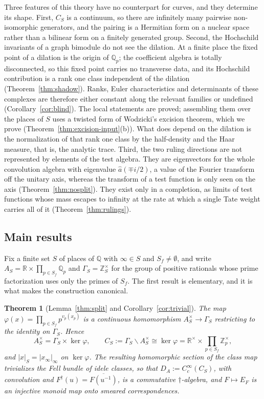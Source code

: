 \documentclass[11pt]{amsart}
\newtheorem{theorem}{Theorem}[section]
\theoremstyle{definition}
\theoremstyle{remark}
\newcommand{\R}{\mathbb R}
\newcommand{\Z}{\mathbb Z}
\newcommand{\Q}{\mathbb Q}
\begin{document}
Three features of this theory have no counterpart for curves, and they
determine its shape.  First, $C_S$ is a continuum, so there are infinitely
many pairwise non-isomorphic generators, and the pairing is a Hermitian form
on a nuclear space rather than a bilinear form on a finitely generated group.
Second, the Hochschild invariants of a graph bimodule do not see the
dilation.  At a finite place the fixed point of a dilation is the origin of
$\Q_p$; the coefficient algebra is totally disconnected, so this fixed point
carries no transverse data, and its Hochschild contribution is a rank one
class independent of the dilation (Theorem~\ref{thm:shadow}).  Ranks, Euler
characteristics and determinants of these complexes are therefore either
constant along the relevant families or undefined
(Corollary~\ref{cor:blind}).  The local statements are proved; assembling them
over the places of $S$ uses a twisted form of Wodzicki's excision theorem,
which we prove (Theorem~\ref{thm:excision-input}(b)).  What does depend on the dilation is the
normalization of that rank one class by the half-density and the Haar
measure, that is, the analytic trace.  Third, the two ruling directions are
not represented by elements of the test algebra.  They are eigenvectors for
the whole convolution algebra with eigenvalue $\widehat a(\mp i/2)$, a value
of the Fourier transform off the unitary axis, whereas the transform of a
test function is only seen on the axis (Theorem~\ref{thm:nosplit}).  They
exist only in a completion, as limits of test functions whose mass escapes to
infinity at the rate at which a single Tate weight carries all of it
(Theorem~\ref{thm:rulings}).

\subsection*{Main results}

Fix a finite set $S$ of places of $\Q$ with $\infty\in S$ and $S_f\ne
\emptyset$, and write $A_S=\R\times\prod_{p\in S_f}\Q_p$ and
$\Gamma_S=\Z_S^{\times}$ for the group of positive rationals whose prime
factorization uses only the primes of $S_f$.  The first result is elementary,
and it is what makes the construction canonical.

\begin{theorem}[Lemma~\ref{thm:split} and
Corollary~\ref{cor:trivial}]\label{thm:introA}
The map $\varphi(x)=\prod_{p\in S_f}p^{v_p(x_p)}$ is a continuous
homomorphism $A_S^{\times}\to\Gamma_S$ restricting to the identity on
$\Gamma_S$.  Hence
\[
A_S^{\times}=\Gamma_S\times\ker\varphi,\qquad
C_S:=\Gamma_S\backslash A_S^{\times}\cong\ker\varphi=
\R^{\times}\times\prod_{p\in S_f}\Z_p^{\times},
\]
and $|x|_S=|x_{\infty}|_{\infty}$ on $\ker\varphi$.  The resulting
homomorphic section of the class map trivializes the Fell bundle of idele
classes, so that $D_A:=C_c^{\infty}(C_S)$, with convolution and
$F^{\dagger}(u)=\overline{F(u^{-1})}$, is a commutative $\dagger$-algebra,
and $F\mapsto E_F$ is an injective monoid map onto smeared correspondences.
\end{theorem}
\end{document}
